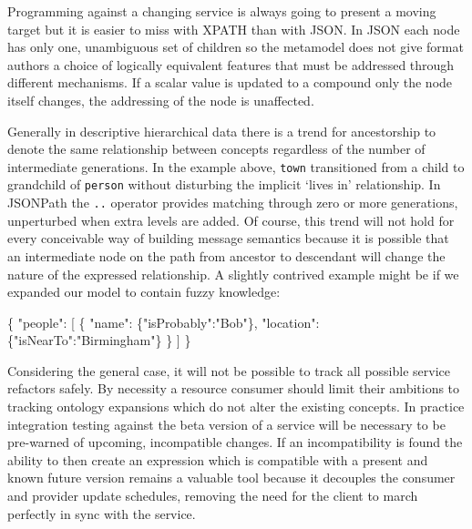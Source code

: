 \documentclass[12pt, ]{article}
\newenvironment{Shaded}{}{}
\newcommand{\StringTok}[1]{\textcolor[rgb]{0.25,0.44,0.63}{{#1}}}
\newcommand{\NormalTok}[1]{{#1}}
\begin{document}
Programming against a changing service is always going to present a
moving target but it is easier to miss with XPATH than with JSON. In
JSON each node has only one, unambiguous set of children so the
metamodel does not give format authors a choice of logically equivalent
features that must be addressed through different mechanisms. If a
scalar value is updated to a compound only the node itself changes, the
addressing of the node is unaffected.

Generally in descriptive hierarchical data there is a trend for
ancestorship to denote the same relationship between concepts regardless
of the number of intermediate generations. In the example above,
\texttt{town} transitioned from a child to grandchild of \texttt{person}
without disturbing the implicit `lives in' relationship. In JSONPath the
\texttt{..} operator provides matching through zero or more generations,
unperturbed when extra levels are added. Of course, this trend will not
hold for every conceivable way of building message semantics because it
is possible that an intermediate node on the path from ancestor to
descendant will change the nature of the expressed relationship. A
slightly contrived example might be if we expanded our model to contain
fuzzy knowledge:

\begin{Shaded}
\begin{Highlighting}[]
\NormalTok{\{}
   \StringTok{"people"}\NormalTok{: [}
      \NormalTok{\{  }
         \StringTok{"name"}\NormalTok{:     \{}\StringTok{"isProbably"}\NormalTok{:}\StringTok{"Bob"}\NormalTok{\},}
         \StringTok{"location"}\NormalTok{: \{}\StringTok{"isNearTo"}\NormalTok{:}\StringTok{"Birmingham"}\NormalTok{\}}
      \NormalTok{\}}
   \NormalTok{]   }
\NormalTok{\}}
\end{Highlighting}
\end{Shaded}

Considering the general case, it will not be possible to track all
possible service refactors safely. By necessity a resource consumer
should limit their ambitions to tracking ontology expansions which do
not alter the existing concepts. In practice integration testing against
the beta version of a service will be necessary to be pre-warned of
upcoming, incompatible changes. If an incompatibility is found the
ability to then create an expression which is compatible with a present
and known future version remains a valuable tool because it decouples
the consumer and provider update schedules, removing the need for the
client to march perfectly in sync with the service.
\end{document}
